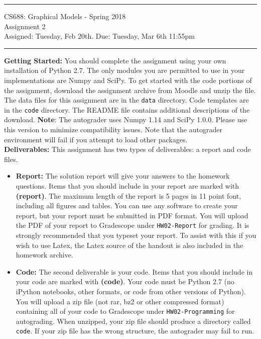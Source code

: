 \documentclass[11pt]{article}
\begin{document}
{\centering
  \rule{6.3in}{2pt}
  \vspace{1em}
  {\Large
    CS688: Graphical Models - Spring 2018\\
    Assignment 2\\
  }
  \vspace{1em}
  Assigned: Tuesday, Feb 20th. Due: Tuesday, Mar 6th 11:55pm\\
  \vspace{0.1em}
  \rule{6.3in}{1.5pt}
}\vspace{1em}

\textbf{Getting Started:} You should complete the assignment using your own installation of Python 2.7. The only modules you are permitted to use in your implementations are Numpy and SciPy. To get started with the code portions of the assignment, download the assignment archive from Moodle and unzip the file. The data files for this assignment are in the \texttt{data} directory. Code templates are in the \texttt{code} directory. The README file contains additional descriptions of the download.  \textbf{Note}: The autograder uses Numpy 1.14 and SciPy 1.0.0. Please use this version to minimize compatibility issues. Note that the autograder environment will fail if you attempt to load other packages.\\

\textbf{Deliverables:} This assignment has two types of deliverables: a report and code files.

\begin{itemize}
\item \textbf{Report: } The solution report will give your answers to the homework questions. Items that you should include in your report are marked with \textbf{(report)}. The maximum length of the report is 5 pages in 11 point font, including all figures and tables. You can use any software to create your report, but your report must be submitted in PDF format. You will upload the PDF of your report to Gradescope under \verb|HW02-Report| for grading. It is strongly recommended that you typeset your report. To assist with this if you wish to use Latex, the Latex source of the handout is also included in the homework archive.

\item \textbf{Code: } The second deliverable is your code. Items that you should include in your code are marked with \textbf{(code)}.  Your code must be Python 2.7 (no iPython notebooks, other formats, or code from other versions of Python). You will upload a zip file (not rar, bz2 or other compressed format) containing all of your code to Gradescope under \verb|HW02-Programming| for autograding.  When unzipped, your zip file should produce a directory called \verb|code|. If your zip file has the wrong structure, the autograder may fail to run.
\end{itemize}
\vspace{0.5em}
\end{document}
